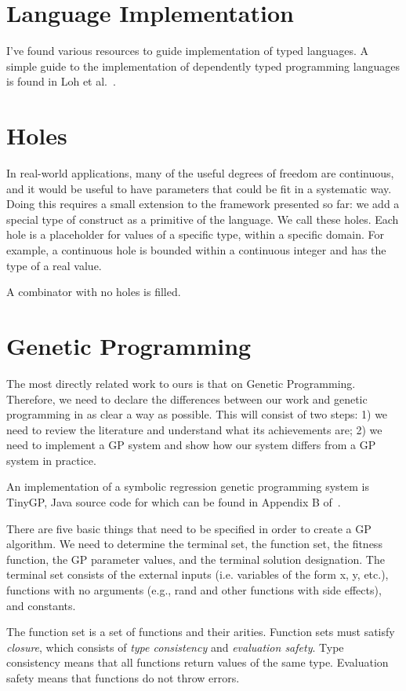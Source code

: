 \documentclass{article}
\begin{document}
\section{Language Implementation}
I've found various resources to guide implementation of typed
languages.  A simple guide to the implementation of dependently typed
programming languages is found in Loh et al.~\cite{lowsimply}.

\section{Holes}
In real-world applications, many of the useful degrees of freedom are
continuous, and it would be useful to have parameters that could be
fit in a systematic way. Doing this requires a small extension to the
framework presented so far: we add a special type of construct as a
primitive of the language. We call these holes. Each hole is a
placeholder for values of a specific type, within a specific
domain. For example, a continuous hole is bounded within a continuous
integer and has the type of a real value.

A combinator with no holes is filled.


\section{Genetic Programming}

The most directly related work to ours is that on Genetic Programming.
Therefore, we need to declare the differences between our work and genetic
programming in as clear a way as possible. This will consist of two steps: 1)
we need to review the literature and understand what its achievements are; 2)
we need to implement a GP system and show how our system differs from a GP
system in practice. 

An implementation of a symbolic regression genetic programming system is
TinyGP, Java source code for which can be found in Appendix B
of~\cite{poli08:fieldguide}. 

There are five basic things that need to be specified in order to create a GP
algorithm. We need to determine the terminal set, the function set, the fitness
function, the GP parameter values, and the terminal solution designation. The
terminal set consists of the external inputs (i.e.  variables of the form x, y,
etc.), functions with no arguments (e.g., rand and other functions with side
effects), and constants. 

The function set is a set of functions and their arities. Function sets must
satisfy \emph{closure}, which consists of \emph{type consistency} and
\emph{evaluation safety}. Type consistency means that all functions return
values of the same type. Evaluation safety means that functions do not throw
errors. 
\end{document}
